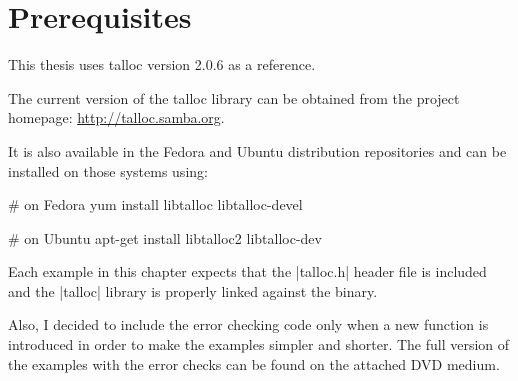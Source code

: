 \section{Prerequisites}
\label{talloc:prerequisites}

This thesis uses talloc version 2.0.6 as a reference.

The current version of the talloc library can be obtained from the project
homepage:
{\footnotesize\url{http://talloc.samba.org}}.

It is also available in the Fedora and Ubuntu distribution repositories and
can be installed on those systems using:

\begin{commandline}
# on Fedora
yum install libtalloc libtalloc-devel

# on Ubuntu
apt-get install libtalloc2 libtalloc-dev
\end{commandline}
\funclistend
Each example in this chapter expects that the |talloc.h| header file is included
and the |talloc| library is properly linked against the binary.

Also, I decided to include the error checking code only when a new function is
introduced in order to make the examples simpler and shorter. The full version
of the examples with the error checks can be found on the attached DVD medium.


